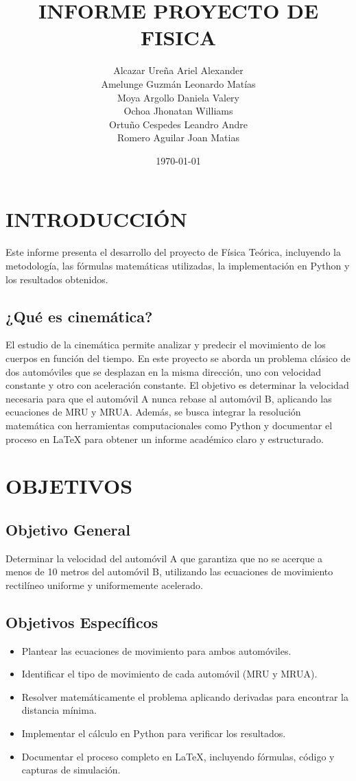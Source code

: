 \documentclass[12pt,a4paper]{article}
\title{INFORME PROYECTO DE FISICA}
\author{Alcazar Ureña Ariel Alexander \\ Amelunge Guzmán Leonardo Matías \\ Moya Argollo Daniela Valery \\ Ochoa Jhonatan Williams \\ Ortuño Cespedes Leandro Andre \\ Romero Aguilar Joan Matias}
\date{\today}
\begin{document}
\maketitle


\section{INTRODUCCIÓN}
Este informe presenta el desarrollo del proyecto de Física Teórica, incluyendo la metodología, 
las fórmulas matemáticas utilizadas, la implementación en Python y los resultados obtenidos.

\subsection{¿Qué es cinemática?}
El estudio de la cinemática permite analizar y predecir el movimiento de los cuerpos en función del tiempo. 
En este proyecto se aborda un problema clásico de dos automóviles que se desplazan en la misma dirección, 
uno con velocidad constante y otro con aceleración constante. El objetivo es determinar la velocidad necesaria 
para que el automóvil A nunca rebase al automóvil B, aplicando las ecuaciones de MRU y MRUA. 
Además, se busca integrar la resolución matemática con herramientas computacionales como Python y documentar 
el proceso en LaTeX para obtener un informe académico claro y estructurado.

\section{OBJETIVOS}
\subsection{Objetivo General}
Determinar la velocidad del automóvil A que garantiza que no se acerque a menos de 10 metros del automóvil B, 
utilizando las ecuaciones de movimiento rectilíneo uniforme y uniformemente acelerado.

\subsection{Objetivos Específicos}
\begin{itemize}
    \item Plantear las ecuaciones de movimiento para ambos automóviles.
    \item Identificar el tipo de movimiento de cada automóvil (MRU y MRUA).
    \item Resolver matemáticamente el problema aplicando derivadas para encontrar la distancia mínima.
    \item Implementar el cálculo en Python para verificar los resultados.
    \item Documentar el proceso completo en LaTeX, incluyendo fórmulas, código y capturas de simulación.
\end{itemize}
\end{document}
